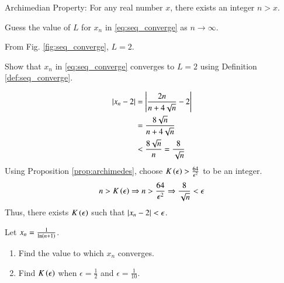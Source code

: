 \documentclass[journal,12pt,twocolumn]{IEEEtran}
\begin{document}
\begin{proposition}
\label{prop:archimedes}
Archimedian Property: For any real number $x$, there exists an integer $n > x$.
\end{proposition}
\begin{problem}
Guess the value of $L$ for $x_n$ in \eqref{eq:seq_converge} as $n \rightarrow \infty$.
\end{problem}
\solution From Fig. \ref{fig:seq_converge}, $L=2$.
\begin{problem}
Show that $x_n$ in \eqref{eq:seq_converge} converges to $L=2$ using Definition \ref{def:seq_converge}.
\end{problem}
\solution
\begin{align}
\left\vert x_n - 2\right\vert &= \left\vert\frac{2n}{n+4\sqrt{n}} - 2\right\vert
\\
&= \frac{8\sqrt{n}}{n+4\sqrt{n}} \\
&< \frac{8\sqrt{n}}{n} = \frac{8}{\sqrt{n}}
\end{align}
Using Proposition \ref{prop:archimedes}, choose $K\left(\epsilon\right) >  \frac{64}{\epsilon^2}$ to be an integer. 
\begin{equation}
n > K\left(\epsilon\right) \Rightarrow n > \frac{64}{\epsilon^2} \Rightarrow \frac{8}{\sqrt{n}} < \epsilon
\end{equation}
%
Thus, there exists $K\left(\epsilon\right)$ such that $\left\vert x_n -2\right\vert < \epsilon$.
\begin{problem}
Let $x_n = \frac{1}{\ln \left(n+1\right)}$.
\begin{enumerate}
\item Find the value to which  $x_n$ converges.
\item Find $K\left(\epsilon\right)$ when $\epsilon = \frac{1}{2}$ and $\epsilon = \frac{1}{10}$.
\end{enumerate}
\end{problem}
\end{document}
